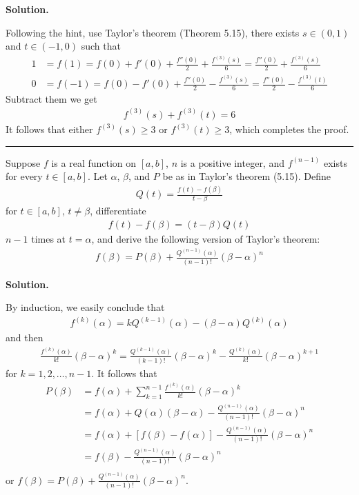 \documentclass[12pt]{article}
\theoremstyle{definition}
\begin{document}
\smallskip
\noindent\textbf{Solution.}\quad

Following the hint, use Taylor's theorem (Theorem 5.15), there exists $s\in(0,1)$ and $t\in(-1,0)$ such that
\begin{align*}
1
&=f(1)
=f(0)+f'(0)+\frac{f''(0)}{2}+\frac{f^{(3)}(s)}{6}
=\frac{f''(0)}{2}+\frac{f^{(3)}(s)}{6} \\
0
&=f(-1)
=f(0)-f'(0)+\frac{f''(0)}{2}-\frac{f^{(3)}(s)}{6}
=\frac{f''(0)}{2}-\frac{f^{(3)}(t)}{6}
\end{align*}
Subtract them we get
\begin{align*}
f^{(3)}(s)+f^{(3)}(t)=6
\end{align*}
It follows that either $f^{(3)}(s)\ge 3$ or $f^{(3)}(t)\ge 3$, which completes the proof.



\bigskip\noindent\hrule\bigskip

Suppose $f$ is a real function on $[a,b]$, $n$ is a positive integer, and $f^{(n-1)}$ exists for every $t\in[a,b]$. Let $\alpha$, $\beta$, and $P$ be as in Taylor's theorem (5.15). Define
\begin{align*}
Q(t)=\frac{f(t)-f(\beta)}{t-\beta}
\end{align*}
for $t\in[a,b]$, $t\ne\beta$, differentiate
\begin{align*}
f(t)-f(\beta)=(t-\beta)Q(t)
\end{align*}
$n-1$ times at $t=\alpha$, and derive the following version of Taylor's theorem:
\begin{align*}
f(\beta)=P(\beta)+\frac{Q^{(n-1)}(\alpha)}{(n-1)!}(\beta-\alpha)^n
\end{align*}

\smallskip
\noindent\textbf{Solution.}\quad

By induction, we easily conclude that
\begin{align*}
f^{(k)}(\alpha)=kQ^{(k-1)}(\alpha)-(\beta-\alpha)Q^{(k)}(\alpha)
\end{align*}
and then
\begin{align*}
\frac{f^{(k)}(\alpha)}{k!}\left(\beta-\alpha\right)^k
=\frac{Q^{(k-1)}(\alpha)}{(k-1)!}\left(\beta-\alpha\right)^k-\frac{Q^{(k)}(\alpha)}{k!}\left(\beta-\alpha\right)^{k+1}
\end{align*}
for $k=1,2,\ldots,n-1$. It follows that
\begin{align*}
P(\beta)
&=f(\alpha)+\sum_{k=1}^{n-1}\frac{f^{(k)}(\alpha)}{k!}\left(\beta-\alpha\right)^k \\
&=f(\alpha)+Q(\alpha)(\beta-\alpha)-\frac{Q^{(n-1)}(\alpha)}{(n-1)!}\left(\beta-\alpha\right)^n \\
&=f(\alpha)+\left[f(\beta)-f(\alpha)\right]-\frac{Q^{(n-1)}(\alpha)}{(n-1)!}\left(\beta-\alpha\right)^n \\
&=f(\beta)-\frac{Q^{(n-1)}(\alpha)}{(n-1)!}\left(\beta-\alpha\right)^n \\
\end{align*}
or $f(\beta)=P(\beta)+\frac{Q^{(n-1)}(\alpha)}{(n-1)!}\left(\beta-\alpha\right)^n$.
\end{document}
